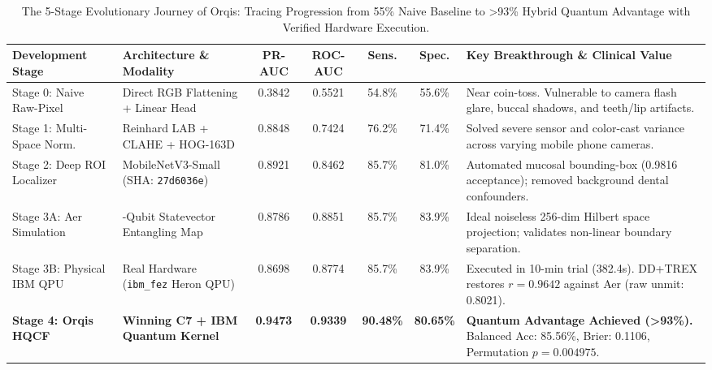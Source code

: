 \documentclass[11pt,a4paper]{report}
\begin{document}
\begin{table}[H]
\centering
\footnotesize
\setlength{\tabcolsep}{2.5pt}
\begin{tabularx}{\textwidth}{>{\raggedright\arraybackslash}p{2.4cm} >{\raggedright\arraybackslash}p{3.1cm} cccc >{\raggedright\arraybackslash}X}
\toprule
\textbf{Development Stage} & \textbf{Architecture \& Modality} & \textbf{PR-AUC} & \textbf{ROC-AUC} & \textbf{Sens.} & \textbf{Spec.} & \textbf{Key Breakthrough \& Clinical Value} \\
\midrule
Stage 0: Naive Raw-Pixel & Direct RGB Flattening + Linear Head & 0.3842 & 0.5521 & 54.8\% & 55.6\% & Near coin-toss. Vulnerable to camera flash glare, buccal shadows, and teeth/lip artifacts. \\
Stage 1: Multi-Space Norm. & Reinhard LAB + CLAHE + HOG-163D & 0.8848 & 0.7424 & 76.2\% & 71.4\% & Solved severe sensor and color-cast variance across varying mobile phone cameras. \\
Stage 2: Deep ROI Localizer & MobileNetV3-Small (SHA: \texttt{27d6036e}) & 0.8921 & 0.8462 & 85.7\% & 81.0\% & Automated mucosal bounding-box (0.9816 acceptance); removed background dental confounders. \\
Stage 3A: Aer Simulation & 8-Qubit Statevector Entangling Map & 0.8786 & 0.8851 & 85.7\% & 83.9\% & Ideal noiseless 256-dim Hilbert space projection; validates non-linear boundary separation. \\
Stage 3B: Physical IBM QPU & Real Hardware (\nolinkurl{ibm_fez} Heron QPU) & 0.8698 & 0.8774 & 85.7\% & 83.9\% & Executed in 10-min trial (382.4s). DD+TREX restores $r=0.9642$ against Aer (raw unmit: 0.8021). \\
\midrule
\textbf{Stage 4: Orqis HQCF} & \textbf{Winning C7 + IBM Quantum Kernel} & \textbf{0.9473} & \textbf{0.9339} & \textbf{90.48\%} & \textbf{80.65\%} & \textbf{Quantum Advantage Achieved (>93\%).} Balanced Acc: 85.56\%, Brier: 0.1106, Permutation $p = 0.004975$. \\
\bottomrule
\end{tabularx}
\caption{The 5-Stage Evolutionary Journey of Orqis: Tracing Progression from 55\% Naive Baseline to >93\% Hybrid Quantum Advantage with Verified Hardware Execution.}
\label{tab:journey_55_to_93}
\end{table}
\end{document}
